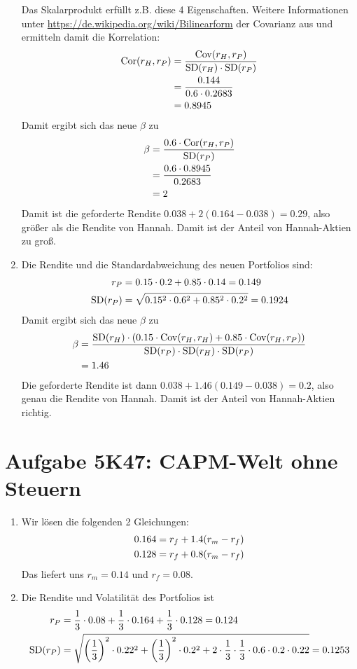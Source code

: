 \documentclass{article}
\DeclareMathOperator{\Cov}{Cov}
\DeclareMathOperator{\SD}{SD}
\DeclareMathOperator{\Cor}{Cor}
\begin{document}
\begin{enumerate}[label=(\alph*)]
{		Das Skalarprodukt erfüllt z.B. diese 4 Eigenschaften. Weitere Informationen unter \url{https://de.wikipedia.org/wiki/Bilinearform}} der Covarianz aus und ermitteln damit die Korrelation:
		\begin{align}
			\Cor(r_H,r_P) &= \frac{\Cov(r_H,r_P)}{\SD(r_H)\cdot \SD(r_P)} \notag \\
			&= \frac{0.144}{0.6\cdot 0.2683} \notag\\
			&= 0.8945 \notag
		\end{align}
		Damit ergibt sich das neue $\beta$ zu
		\begin{align}
			\beta &= \frac{0.6\cdot\Cor(r_H,r_P)}{\SD(r_P)} \notag \\
			&= \frac{0.6\cdot 0.8945}{0.2683} \notag \\
			&= 2 \notag
		\end{align}
		Damit ist die geforderte Rendite $0.038 + 2(0.164-0.038)=0.29$, also größer als die Rendite von Hannah. Damit ist der Anteil von Hannah-Aktien zu groß.
		\item Die Rendite und die Standardabweichung des neuen Portfolios sind:
		\begin{align}
			r_P &= 0.15\cdot 0.2 + 0.85\cdot 0.14 = 0.149 \notag \\
			\SD(r_P) &= \sqrt{0.15^2\cdot 0.6^2 + 0.85^2 \cdot 0.2^2} = 0.1924 \notag
		\end{align}
		Damit ergibt sich das neue $\beta$ zu
		\begin{align}
			\beta &= \frac{\SD(r_H)\cdot\left(0.15\cdot \Cov(r_H,r_H) + 0.85\cdot \Cov(r_H,r_P)\right)}{\SD(r_P)\cdot \SD(r_H)\cdot \SD(r_P)} \notag \\
			&= 1.46 \notag
		\end{align}
		Die geforderte Rendite ist dann $0.038 + 1.46(0.149-0.038)=0.2$, also genau die Rendite von Hannah. Damit ist der Anteil von Hannah-Aktien richtig.
	\end{enumerate}

	\section*{Aufgabe 5K47: CAPM-Welt ohne Steuern}
	\begin{enumerate}[label=(\alph*)]
		\item Wir lösen die folgenden 2 Gleichungen:
		\begin{align}
			0.164 &= r_f + 1.4(r_m-r_f) \notag \\
			0.128 &= r_f + 0.8(r_m-r_f) \notag
		\end{align}
		Das liefert uns $r_m=0.14$ und $r_f=0.08$.
		\item Die Rendite und Volatilität des Portfolios ist
		\begin{align}
			r_P &= \frac{1}{3}\cdot 0.08 + \frac{1}{3}\cdot 0.164 + \frac{1}{3}\cdot 0.128 = 0.124 \notag \\
			\SD(r_P) &= \sqrt{\left(\frac{1}{3}\right)^2\cdot 0.22^2 + \left(\frac{1}{3}\right)^2\cdot 0.2^2 + 2\cdot\frac{1}{3}\cdot\frac{1}{3}\cdot 0.6\cdot 0.2\cdot 0.22} = 0.1253 \notag
		\end{align}
	\end{enumerate}
\end{document}
